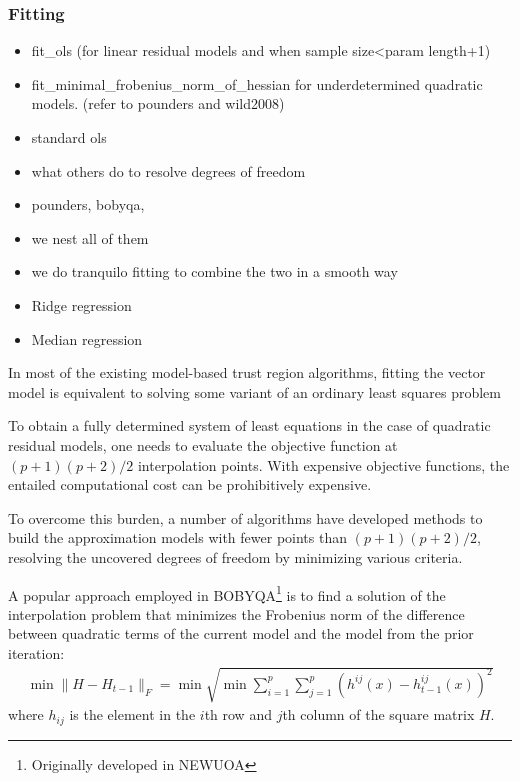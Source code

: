 \subsubsection{Fitting}
\label{subsubsec:fitting}
\begin{itemize}
    \item fit\_ols (for linear residual models and when sample size<param length+1)
    \item fit\_minimal\_frobenius\_norm\_of\_hessian for underdetermined quadratic models. (refer to pounders and wild2008)
    \item standard ols
    \item what others do to resolve degrees of freedom
    \item pounders, bobyqa,
    \item we nest all of them
    \item we do tranquilo fitting to combine the two in a smooth way

    \item Ridge regression
    \item Median regression
\end{itemize}


In most of the existing model-based trust region algorithms, fitting the vector model is equivalent to solving some variant of an ordinary least squares problem

To obtain a fully determined system of least equations in the case of quadratic residual models, one needs to evaluate the objective function at $(p+1)(p+2)/2$ interpolation points. With expensive objective functions, the entailed computational cost can be prohibitively expensive.

To overcome this burden, a number of algorithms have developed methods to build the approximation models with fewer points than  $(p+1)(p+2)/2$, resolving the uncovered degrees of freedom by minimizing various criteria.

A popular approach employed in BOBYQA\footnote{Originally developed in NEWUOA} is to find a solution of the interpolation problem that minimizes the Frobenius norm of the difference between quadratic terms of the current model and the model from the prior iteration:
\begin{align}
    \min\lVert H-H_{t-1}\rVert_F = \min\sqrt{\min\sum\limits_{i=1}^p\sum\limits_{j=1}^{p}(h^{ij}(x)-h^{ij}_{t-1}(x))^2}
    \label{eq:min-frob-diff}
\end{align}
where $h_{ij}$ is the element in the $i$th row and $j$th column of the square matrix $H$.

